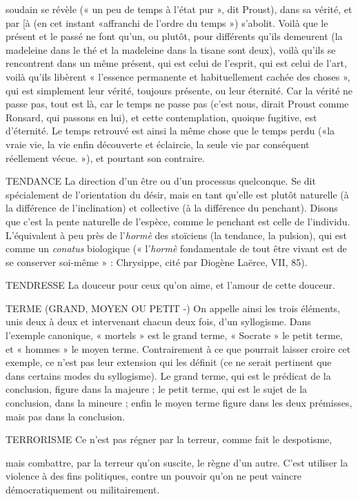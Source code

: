 soudain se révèle (« un peu de temps à l’état pur », dit
Proust), dans sa vérité, et par [à (en cet instant «affranchi de l’ordre du
temps ») s’abolit. Voilà que le présent et le passé ne font qu’un, ou plutôt, pour
différents qu’ils demeurent (la madeleine dans le thé et la madeleine dans la
tisane sont deux), voilà qu’ils se rencontrent dans un même présent, qui est
celui de l'esprit, qui est celui de l’art, voilà qu’ils libèrent « l’essence permanente
et habituellement cachée des choses », qui est simplement leur vérité, toujours
présente, ou leur éternité. Car la vérité ne passe pas, tout est là, car le temps ne
passe pas (c’est nous, dirait Proust comme Ronsard, qui passons en lui), et cette
contemplation, quoique fugitive, est d’éternité. Le temps retrouvé est ainsi la
même chose que le temps perdu («la vraie vie, la vie enfin découverte et
éclaircie, la seule vie par conséquent réellement vécue. »), et pourtant son
contraire.

TENDANCE La direction d’un être ou d’un processus quelconque. Se dit
spécialement de l'orientation du désir, mais en tant qu’elle est
plutôt naturelle (à la différence de l’inclination) et collective (à la différence du
penchant). Disons que c’est la pente naturelle de l’espèce, comme le penchant
est celle de l’individu. L’équivalent à peu près de l’{\it hormè} des stoïciens (la tendance,
la pulsion), qui est comme un {\it conatus} biologique (« l’{\it hormè} fondamentale
de tout être vivant est de se conserver soi-même » : Chrysippe, cité par
Diogène Laërce, VII, 85).

TENDRESSE La douceur pour ceux qu’on aime, et l’amour de cette douceur.

TERME (GRAND, MOYEN OU PETIT -) On appelle ainsi les trois éléments,
unis deux à deux et
intervenant chacun deux fois, d’un syllogisme. Dans l’exemple canonique,
« mortels » est le grand terme, « Socrate » le petit terme, et « hommes » le moyen
terme. Contrairement à ce que pourrait laisser croire cet exemple, ce n’est pas leur
extension qui les définit (ce ne serait pertinent que dans certains modes du syllogisme).
Le grand terme, qui est le prédicat de la conclusion, figure dans la
majeure ; le petit terme, qui est le sujet de la conclusion, dans la mineure ; enfin
le moyen terme figure dans les deux prémisses, mais pas dans la conclusion.

TERRORISME Ce n’est pas régner par la terreur, comme fait le despotisme,

mais combattre, par la terreur qu’on suscite, le règne d’un
autre. C’est utiliser la violence à des fins politiques, contre un pouvoir qu’on ne
peut vaincre démocratiquement ou militairement.

